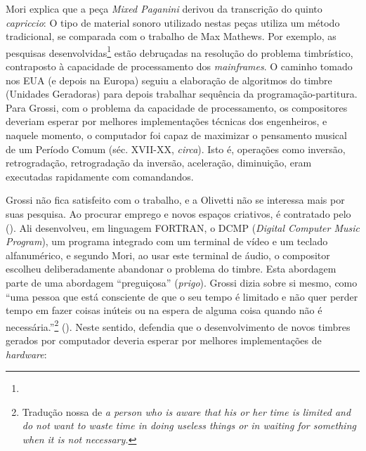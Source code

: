 Mori explica que a peça \emph{Mixed Paganini} derivou da transcrição do quinto \emph{capriccio}:  O tipo de material sonoro utilizado nestas peças utiliza um método tradicional, se comparada com o trabalho de Max Mathews. Por exemplo, as pesquisas desenvolvidas\footnote{} estão debruçadas na resolução do problema timbrístico, contraposto à capacidade de processamento dos \emph{mainframes}. O caminho tomado nos EUA (e depois na Europa) seguiu a elaboração de algoritmos do timbre (Unidades Geradoras) para depois trabalhar sequência da programação-partitura. Para Grossi, com o problema da capacidade de processamento, os compositores deveriam esperar por melhores implementações técnicas dos engenheiros, e naquele momento, o computador foi capaz de maximizar o pensamento musical de um Período Comum (séc. XVII-XX, \emph{circa}). Isto é, operações como inversão, retrogradação, retrogradação da inversão, aceleração, diminuição, eram executadas rapidamente com comandandos. 

Grossi não fica satisfeito com o trabalho, e a Olivetti não se interessa mais por suas pesquisa. Ao procurar emprego e novos espaços criativos, é contratado pelo (\idemibdem). Ali desenvolveu, em linguagem FORTRAN, o DCMP (\emph{Digital Computer Music Program}), um programa integrado com um terminal de vídeo e um teclado alfanumérico, e segundo Mori, ao usar este terminal de áudio, o compositor escolheu deliberadamente abandonar o problema do timbre.  Esta abordagem parte de uma abordagem ``preguiçosa'' (\emph{prigo}). Grossi dizia sobre si mesmo, como ``uma pessoa que está consciente de que o seu tempo é limitado e não quer perder tempo em fazer coisas inúteis ou na espera de alguma coisa quando não é necessária.''\footnote{Tradução nossa de \emph{a person who is aware that his or her time is limited and do not want to waste time in doing useless things or in waiting for something when it is not necessary.}} (\idemibdem). Neste sentido, defendia que o desenvolvimento de novos timbres gerados por computador deveria esperar por melhores implementações de \emph{hardware}:

